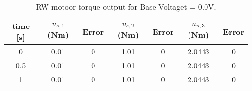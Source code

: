 \begin{table}[htbp]\caption{RW motoor torque output for Base Voltaget = 0.0V.}\label{tbl:baseVoltage0.0}\centering\begin{tabular}{ccccccc}
\hline
  time [s]  &  $u_{s,1}$ (Nm)  &  Error  &  $u_{s,2}$ (Nm)  &  Error  &  $u_{u,3}$ (Nm)  &  Error  \\
\hline
     0      &       0.01       &    0    &       1.01       &    0    &      2.0443      &    0    \\
    0.5     &       0.01       &    0    &       1.01       &    0    &      2.0443      &    0    \\
     1      &       0.01       &    0    &       1.01       &    0    &      2.0443      &    0    \\
\hline\end{tabular}\end{table}